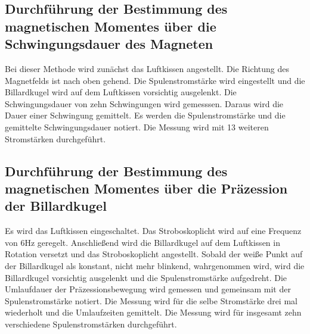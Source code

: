 \subsection{Durchführung der Bestimmung des magnetischen Momentes über die Schwingungsdauer des Magneten}
Bei dieser Methode wird zunächst das Luftkissen angestellt.
Die Richtung des Magnetfelds ist nach oben gehend.
Die Spulenstromstärke wird eingestellt und die Billardkugel wird auf dem Luftkissen vorsichtig ausgelenkt.
Die Schwingungsdauer von zehn Schwingungen wird gemesssen.
Daraus wird die Dauer einer Schwingung gemittelt.
Es werden die Spulenstromstärke und die gemittelte Schwingungsdauer notiert.
Die Messung wird mit 13 weiteren Stromstärken durchgeführt.

\subsection{Durchführung der Bestimmung des magnetischen Momentes über die Präzession der Billardkugel}
Es wird das Luftkissen eingeschaltet.
Das Stroboskoplicht wird auf eine Frequenz von 6Hz geregelt.
Anschließend wird die Billardkugel auf dem Luftkissen in Rotation versetzt und das Stroboskoplicht angestellt.
Sobald der weiße Punkt auf der Billardkugel als konstant, nicht mehr blinkend, wahrgenommen wird, wird die Billardkugel vorsichtig ausgelenkt und die Spulenstromstärke aufgedreht.
Die Umlaufdauer der Präzessionsbewegung wird gemessen und gemeinsam mit der Spulenstromstärke notiert.
Die Messung wird für die selbe Stromstärke drei mal wiederholt und die Umlaufzeiten gemittelt.
Die Messung wird für insgesamt zehn verschiedene Spulenstromstärken durchgeführt.
